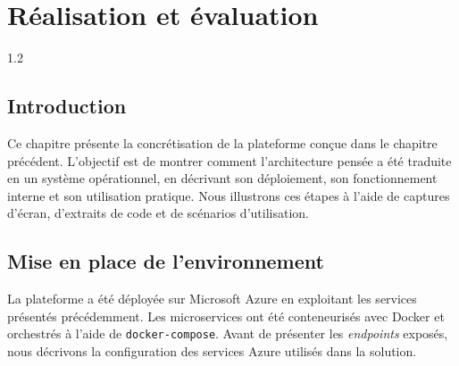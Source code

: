 
\chapter{Réalisation et évaluation}
\begin{spacing}{1.2}
\minitoc
\thispagestyle{MyStyle}
\end{spacing}
\newpage

\section{Introduction}
Ce chapitre présente la concrétisation de la plateforme conçue dans le chapitre précédent. 
L’objectif est de montrer comment l’architecture pensée a été traduite en un système opérationnel, 
en décrivant son déploiement, son fonctionnement interne et son utilisation pratique. 
Nous illustrons ces étapes à l’aide de captures d’écran, d’extraits de code et de scénarios d’utilisation.

\section{Mise en place de l’environnement}
La plateforme a été déployée sur Microsoft Azure en exploitant les services présentés précédemment.
Les microservices ont été conteneurisés avec Docker et orchestrés à l’aide de \texttt{docker-compose}. 
Avant de présenter les \textit{endpoints} exposés, nous décrivons la configuration des services Azure utilisés dans la solution.

